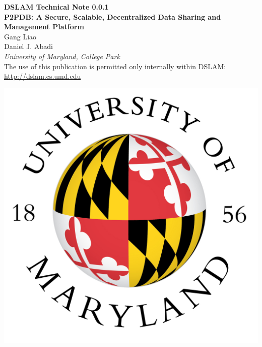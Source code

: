 \documentclass[12pt]{article}
\newcommand{\pubnumber}{0.0.1}
\begin{document}
	
	\begin{titlepage}
		\begin{flushright}
\LARGE{\textbf{DSLAM Technical Note \pubnumber}}\\
\vfill
\LARGE{\textbf{P2PDB: A Secure, Scalable, Decentralized Data Sharing and Management Platform}}\\
\vfill
\large Gang Liao\\
\large Daniel J. Abadi\\
\textit{University of Maryland, College Park}\\
\vfill
\normalsize The use of this publication is permitted only internally within DSLAM:\\
\url{http://dslam.cs.umd.edu}\\
\vfill

\includegraphics[width=0.2\linewidth]{img.jpg}\\ 


\end{flushright}
\end{titlepage}
\end{document}
